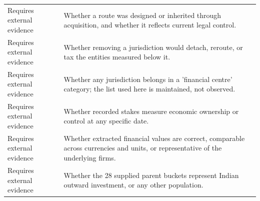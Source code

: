 \begin{tabular}{ll}
Requires external evidence & Whether a route was designed or inherited through acquisition, and whether it reflects current legal control. \\
Requires external evidence & Whether removing a jurisdiction would detach, reroute, or tax the entities measured below it. \\
Requires external evidence & Whether any jurisdiction belongs in a 'financial centre' category; the list used here is maintained, not observed. \\
Requires external evidence & Whether recorded stakes measure economic ownership or control at any specific date. \\
Requires external evidence & Whether extracted financial values are correct, comparable across currencies and units, or representative of the underlying firms. \\
Requires external evidence & Whether the 28 supplied parent buckets represent Indian outward investment, or any other population. \\
\bottomrule
\end{tabular}
